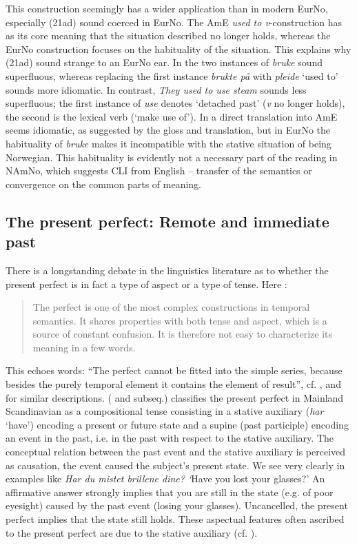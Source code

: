 \documentclass[output=paper]{langscibook}
\begin{document}
This construction seemingly has a wider application than in modern EurNo, especially (21ad) sound coerced in EurNo. The AmE \textit{used to v}{}-construction has as its core meaning that the situation described no longer holds, whereas the EurNo construction focuses on the habituality of the situation. This explains why (21ad) sound strange to an EurNo ear. In  the two instances of \textit{bruke} sound superfluous, whereas replacing the first instance \textit{brukte på} with \textit{pleide} ‘used to’ sounds more idiomatic. In contrast, \textit{They used to use steam} sounds less superfluous; the first instance of \textit{use} denotes ‘detached past’ (\textit{v} no longer holds), the second is the lexical verb (‘make use of’). In  a direct translation into AmE seems idiomatic, as suggested by the gloss and translation, but in EurNo the habituality of \textit{bruke} makes it incompatible with the stative situation of being Norwegian. This habituality is evidently not a necessary part of the reading in NAmNo, which suggests CLI from English – transfer of the semantics or convergence on the common parts of meaning. 

\subsection{The present perfect: Remote and immediate past}
\label{sec:eide:4.3}
There is a longstanding debate in the linguistics literature as to whether the present perfect is in fact a type of aspect or a type of tense. Here \citet{GrønnvonStechow2020}:

\begin{quote}
The perfect is one of the most complex constructions in temporal semantics. It shares properties with both tense and aspect, which is a source of constant confusion. It is therefore not easy to characterize its meaning in a few words.
\end{quote}

This echoes  words: “The perfect cannot be fitted into the simple series, because besides the purely temporal element it contains the element of result”, cf. \citet{Comrie2020}, \citet{Dahl2000} and \citet{EideFryd2021} for similar descriptions. \citeauthor{Eide2002} (\citeyear{Eide2002} and subseq.) classifies the present perfect in Mainland Scandinavian as a compositional tense consisting in a stative auxiliary (\textit{har} ‘have’) encoding a present or future state and a supine (past participle) encoding an event in the past, i.e. in the past with respect to the stative auxiliary. The conceptual relation between the past event and the stative auxiliary is perceived as causation, the event caused the subject’s present state. We see very clearly in examples like \textit{Har du mistet brillene dine? ‘}Have you lost your glasses?’ An affirmative answer strongly implies that you are still in the state (e.g. of poor eyesight) caused by the past event (losing your glasses). Uncancelled, the present perfect implies that the state still holds. These aspectual features often ascribed to the present perfect are due to the stative auxiliary (cf. \citealt{Eide2020Modality, EideFryd2021}). 
\end{document}
